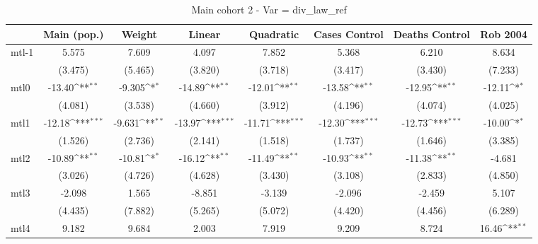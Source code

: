 \documentclass{article}
\begin{document}
{
\def\sym#1{\ifmmode^{#1}\else\(^{#1}\)\fi}
\begin{longtable}{l*{7}{c}}
\caption{Main cohort 2 - Var = div\_law\_ref}\\
\hline\hline\endfirsthead\hline\endhead\hline\endfoot\endlastfoot
                &\multicolumn{1}{c}{Main (pop.)}&\multicolumn{1}{c}{Weight}&\multicolumn{1}{c}{Linear}&\multicolumn{1}{c}{Quadratic}&\multicolumn{1}{c}{Cases Control}&\multicolumn{1}{c}{Deaths Control}&\multicolumn{1}{c}{Rob 2004}\\
\hline
mtl-1           &    5.575         &    7.609         &    4.097         &    7.852         &    5.368         &    6.210         &    8.634         \\
                &  (3.475)         &  (5.465)         &  (3.820)         &  (3.718)         &  (3.417)         &  (3.430)         &  (7.233)         \\
mtl0            &   -13.40\sym{**} &   -9.305\sym{*}  &   -14.89\sym{**} &   -12.01\sym{**} &   -13.58\sym{**} &   -12.95\sym{**} &   -12.11\sym{*}  \\
                &  (4.081)         &  (3.538)         &  (4.660)         &  (3.912)         &  (4.196)         &  (4.074)         &  (4.025)         \\
mtl1            &   -12.18\sym{***}&   -9.631\sym{**} &   -13.97\sym{***}&   -11.71\sym{***}&   -12.30\sym{***}&   -12.73\sym{***}&   -10.00\sym{*}  \\
                &  (1.526)         &  (2.736)         &  (2.141)         &  (1.518)         &  (1.737)         &  (1.646)         &  (3.385)         \\
mtl2            &   -10.89\sym{**} &   -10.81\sym{*}  &   -16.12\sym{**} &   -11.49\sym{**} &   -10.93\sym{**} &   -11.38\sym{**} &   -4.681         \\
                &  (3.026)         &  (4.726)         &  (4.628)         &  (3.430)         &  (3.108)         &  (2.833)         &  (4.850)         \\
mtl3            &   -2.098         &    1.565         &   -8.851         &   -3.139         &   -2.096         &   -2.459         &    5.107         \\
                &  (4.435)         &  (7.882)         &  (5.265)         &  (5.072)         &  (4.420)         &  (4.456)         &  (6.289)         \\
mtl4            &    9.182         &    9.684         &    2.003         &    7.919         &    9.209         &    8.724         &    16.46\sym{**} \\

\end{longtable}}
\end{document}
